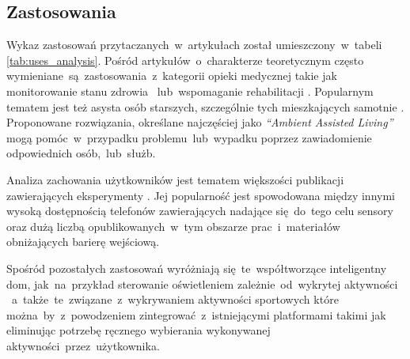 \subsection{Zastosowania}
Wykaz zastosowań przytaczanych~w~artykułach został umieszczony~w~tabeli \ref{tab:uses_analysis}. Pośród artykułów~o~charakterze teoretycznym często wymieniane~są~zastosowania~z~kategorii opieki medycznej takie jak monitorowanie stanu zdrowia \cite{S22}~lub~wspomaganie rehabilitacji \cite{S35}. Popularnym tematem jest też asysta osób starszych, szczególnie tych mieszkających samotnie \cite{S21}. Proponowane rozwiązania, określane najczęściej jako \textit{``Ambient Assisted Living''} mogą pomóc~w~przypadku problemu~lub~wypadku poprzez zawiadomienie odpowiednich osób,~lub~służb.

Analiza zachowania użytkowników jest tematem większości publikacji zawierających eksperymenty \cite{S02, S59, S33}. Jej popularność jest spowodowana między innymi wysoką dostępnością telefonów zawierających nadające się~do~tego celu sensory oraz dużą liczbą opublikowanych~w~tym obszarze prac~i~materiałów obniżających barierę wejściową.

Spośród pozostałych zastosowań wyróżniają się~te~współtworzące inteligentny dom, jak~na~przykład sterowanie oświetleniem zależnie~od~wykrytej aktywności \cite{S36}~a~także~te~związane~z~wykrywaniem aktywności sportowych \cite{S29} które można~by~z~powodzeniem zintegrować~z~istniejącymi platformami takimi jak  eliminując potrzebę ręcznego wybierania wykonywanej aktywności~przez~użytkownika.


